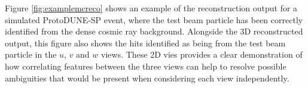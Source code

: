 Figure \ref{fig:examplemcreco} shows an example of the reconstruction output for a simulated ProtoDUNE-SP event, where the test beam particle has been correctly identified from the dense cosmic ray background.  Alongside the 3D reconstructed output, this figure also shows the hits identified as being from the test beam particle in the $u$, $v$ and $w$ views.  These 2D vies provides a clear demonstration of how correlating features between the three views can help to resolve possible ambiguities that would be present when considering each view independently.  

\begin{figure}
\centering
{} \\

\end{figure}
